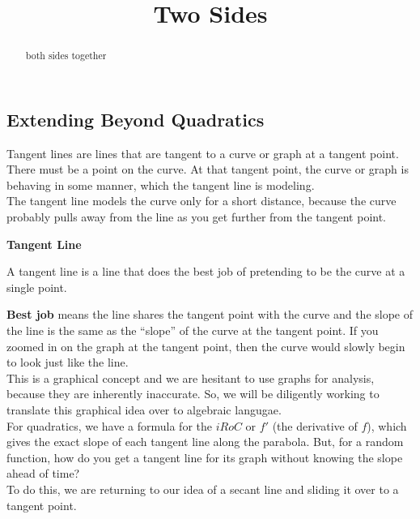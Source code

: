\documentclass{ximera}
\title{Two Sides}
\begin{document}
\begin{abstract}
both sides together
\end{abstract}
\maketitle
 
 



\subsection*{Extending Beyond Quadratics} 


Tangent lines are lines that are tangent to a curve or graph at a tangent point. There must be a point on the curve. At that tangent point, the curve or graph is behaving in some manner, which the tangent line is modeling.  \\

The tangent line models the curve only for a short distance, because the curve probably pulls away from the line as you get further from the tangent point.\\

\begin{idea} \textbf{\textcolor{blue!55!black}{Tangent Line}}


A tangent line is a line that does the best job of pretending to be the curve at a single point.
\end{idea}


\textbf{Best job} means the line shares the tangent point with the curve and the slope of the line is the same as the ``slope'' of the curve at the tangent point. If you zoomed in on the graph at the tangent point, then the curve would slowly begin to look just like the line. \\

This is a graphical concept and we are hesitant to use graphs for analysis, because they are inherently inaccurate. So, we will be diligently working to translate this graphical idea over to algebraic langugae. \\


For quadratics, we have a formula for the $iRoC$ or $f'$ (the derivative of $f$), which gives the exact slope of each tangent line along the parabola.  But, for a random function, how do you get a tangent line for its graph without knowing the slope ahead of time? \\


To do this, we are returning to our idea of a secant line and sliding it over to a tangent point. \\
\end{document}
